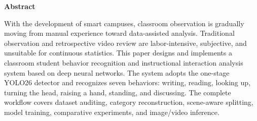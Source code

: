 \documentclass[12pt,hyperref,a4paper,UTF8]{ctexart}
\begin{document}
\cover
\thispagestyle{empty}
\clearpage
{}
\begin{abstract}
随着智慧校园建设不断推进，课堂教学过程逐渐由经验观察向数据辅助分析转变。传统课堂行为记录主要依赖教师人工观察或课后回看视频，存在工作量大、主观性较强、难以形成连续统计等问题。针对上述问题，本文设计并实现了一套基于深度神经网络的课堂学生行为识别与教学互动分析系统。系统以单阶段目标检测网络YOLO26为核心，将课堂中的学生行为划分为书写、阅读、抬头听讲、转头、举手、站立和讨论七类，在公开课堂行为数据基础上完成数据审计、类别重构、场景感知划分、模型训练、对比实验以及图片和视频推理模块开发。\par
数据审计结果表明，所使用的SCBehavior数据实际包含400幅图像和8083个有效目标框。为降低同一课堂场景相邻画面跨集合分布造成的数据泄漏风险，本文利用ResNet18图像特征进行场景相似度分析，将数据划分为281幅训练图像、59幅验证图像和60幅独立测试图像。在相同测试集上，基线YOLO26n@640模型取得0.7711的mAP@0.5和0.5667的mAP@0.5:0.95。通过比较增大模型容量和提高输入分辨率两种改进方案，最终采用YOLO26s@640作为系统模型，其精确率、召回率、mAP@0.5和mAP@0.5:0.95分别达到0.7373、0.7926、0.8221和0.6065。与基线相比，mAP@0.5提高5.10个百分点，阅读、转头和举手等关键类别的AP@0.5分别提高10.92、11.79和12.74个百分点。\par
在工程实现方面，本文使用Python、PyTorch和Ultralytics构建训练及推理流程，开发了支持单幅图像和课堂视频输入的识别模块。系统能够输出带中文行为标签的可视化结果，并生成JSON汇总和CSV时间线，为课堂活动回顾和教学互动趋势分析提供辅助信息。研究同时指出，当前系统输出属于逐帧检测结果，尚未实现跨帧身份跟踪，不能将累计检测次数直接解释为去重后的学生人数或教学质量评分。实验结果表明，该系统能够在有限课堂数据条件下实现较为有效的多类别行为检测，具有一定的课程教学演示价值和后续扩展空间。\par
\par\noindent\textbf{关键词：}智慧校园；课堂行为识别；目标检测；深度学习；YOLO26；教学互动分析
\end{abstract}
\begin{center}\textbf{Abstract}\end{center}
With the development of smart campuses, classroom observation is gradually moving from manual experience toward data-assisted analysis. Traditional observation and retrospective video review are labor-intensive, subjective, and unsuitable for continuous statistics. This paper designs and implements a classroom student behavior recognition and instructional interaction analysis system based on deep neural networks. The system adopts the one-stage YOLO26 detector and recognizes seven behaviors: writing, reading, looking up, turning the head, raising a hand, standing, and discussing. The complete workflow covers dataset auditing, category reconstruction, scene-aware splitting, model training, comparative experiments, and image/video inference.\par
\end{document}
